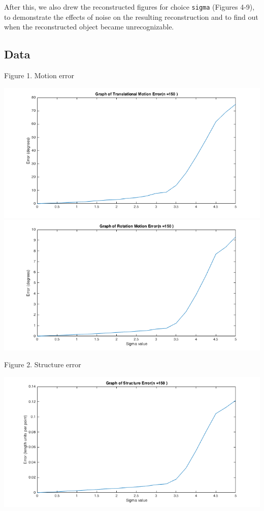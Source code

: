 \documentclass{article}
\begin{document}
After this, we also drew the reconstructed figures for choice \texttt{sigma} (Figures 4-9), to demonstrate the effects of noise on the resulting reconstruction and to find out when the reconstructed object became unrecognizable.


\newpage
\subsection{Data}
\begin{center}
	\begin{center}Figure 1. Motion error\end{center}
	\includegraphics[width=.7\textwidth,keepaspectratio]{translation_motion_error.png}
	\includegraphics[width=.7\textwidth,keepaspectratio]{rotation_motion_error.png}
	\begin{center}Figure 2. Structure error\end{center}
	\includegraphics[width=.7\textwidth,keepaspectratio]{structure_error.png}
	\newpage


\end{center}
\end{document}

